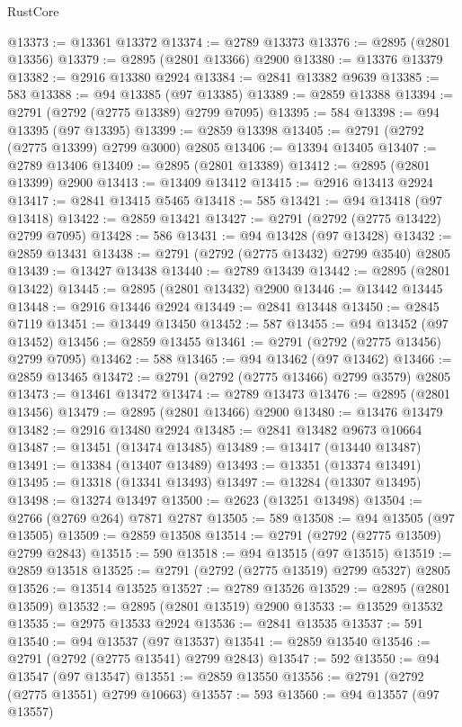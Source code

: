\begin{lexlean}{RustCore}
\begin{coremodule}
@13373 := @13361 @13372
@13374 := @2789 @13373
@13376 := @2895 (@2801 @13356)
@13379 := @2895 (@2801 @13366) @2900
@13380 := @13376 @13379
@13382 := @2916 @13380 @2924
@13384 := @2841 @13382 @9639
@13385 := 583
@13388 := @94 @13385 (@97 @13385)
@13389 := @2859 @13388
@13394 := @2791 (@2792 (@2775 @13389) @2799 @7095)
@13395 := 584
@13398 := @94 @13395 (@97 @13395)
@13399 := @2859 @13398
@13405 := @2791 (@2792 (@2775 @13399) @2799 @3000) @2805
@13406 := @13394 @13405
@13407 := @2789 @13406
@13409 := @2895 (@2801 @13389)
@13412 := @2895 (@2801 @13399) @2900
@13413 := @13409 @13412
@13415 := @2916 @13413 @2924
@13417 := @2841 @13415 @5465
@13418 := 585
@13421 := @94 @13418 (@97 @13418)
@13422 := @2859 @13421
@13427 := @2791 (@2792 (@2775 @13422) @2799 @7095)
@13428 := 586
@13431 := @94 @13428 (@97 @13428)
@13432 := @2859 @13431
@13438 := @2791 (@2792 (@2775 @13432) @2799 @3540) @2805
@13439 := @13427 @13438
@13440 := @2789 @13439
@13442 := @2895 (@2801 @13422)
@13445 := @2895 (@2801 @13432) @2900
@13446 := @13442 @13445
@13448 := @2916 @13446 @2924
@13449 := @2841 @13448
@13450 := @2845 @7119
@13451 := @13449 @13450
@13452 := 587
@13455 := @94 @13452 (@97 @13452)
@13456 := @2859 @13455
@13461 := @2791 (@2792 (@2775 @13456) @2799 @7095)
@13462 := 588
@13465 := @94 @13462 (@97 @13462)
@13466 := @2859 @13465
@13472 := @2791 (@2792 (@2775 @13466) @2799 @3579) @2805
@13473 := @13461 @13472
@13474 := @2789 @13473
@13476 := @2895 (@2801 @13456)
@13479 := @2895 (@2801 @13466) @2900
@13480 := @13476 @13479
@13482 := @2916 @13480 @2924
@13485 := @2841 @13482 @9673 @10664
@13487 := @13451 (@13474 @13485)
@13489 := @13417 (@13440 @13487)
@13491 := @13384 (@13407 @13489)
@13493 := @13351 (@13374 @13491)
@13495 := @13318 (@13341 @13493)
@13497 := @13284 (@13307 @13495)
@13498 := @13274 @13497
@13500 := @2623 (@13251 @13498)
@13504 := @2766 (@2769 @264) @7871 @2787
@13505 := 589
@13508 := @94 @13505 (@97 @13505)
@13509 := @2859 @13508
@13514 := @2791 (@2792 (@2775 @13509) @2799 @2843)
@13515 := 590
@13518 := @94 @13515 (@97 @13515)
@13519 := @2859 @13518
@13525 := @2791 (@2792 (@2775 @13519) @2799 @5327) @2805
@13526 := @13514 @13525
@13527 := @2789 @13526
@13529 := @2895 (@2801 @13509)
@13532 := @2895 (@2801 @13519) @2900
@13533 := @13529 @13532
@13535 := @2975 @13533 @2924
@13536 := @2841 @13535
@13537 := 591
@13540 := @94 @13537 (@97 @13537)
@13541 := @2859 @13540
@13546 := @2791 (@2792 (@2775 @13541) @2799 @2843)
@13547 := 592
@13550 := @94 @13547 (@97 @13547)
@13551 := @2859 @13550
@13556 := @2791 (@2792 (@2775 @13551) @2799 @10663)
@13557 := 593
@13560 := @94 @13557 (@97 @13557)

\end{coremodule}
\end{lexlean}
